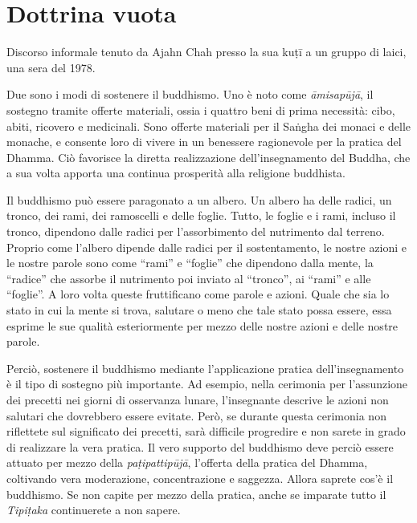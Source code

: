 \chapter{Dottrina vuota}

\begin{openingQuote}
  \centering

  Discorso informale tenuto da Ajahn Chah presso la sua kuṭī a un gruppo
  di laici, una sera del 1978.
\end{openingQuote}

Due sono i modi di sostenere il buddhismo. Uno è noto come
\emph{āmisapūjā}, il sostegno tramite offerte materiali, ossia i quattro
beni di prima necessità: cibo, abiti, ricovero e medicinali. Sono
offerte materiali per il Saṅgha dei monaci e delle monache, e consente
loro di vivere in un benessere ragionevole per la pratica del Dhamma.
Ciò favorisce la diretta realizzazione dell'insegnamento del Buddha, che
a sua volta apporta una continua prosperità alla religione buddhista.

Il buddhismo può essere paragonato a un albero. Un albero ha delle
radici, un tronco, dei rami, dei ramoscelli e delle foglie. Tutto, le
foglie e i rami, incluso il tronco, dipendono dalle radici per
l'assorbimento del nutrimento dal terreno. Proprio come l'albero
dipende dalle radici per il sostentamento, le nostre azioni e le nostre
parole sono come ``rami'' e ``foglie'' che dipendono dalla mente, la
``radice'' che assorbe il nutrimento poi inviato al ``tronco'', ai
``rami'' e alle ``foglie''. A loro volta queste fruttificano come parole
e azioni. Quale che sia lo stato in cui la mente si trova, salutare o
meno che tale stato possa essere, essa esprime le sue qualità
esteriormente per mezzo delle nostre azioni e delle nostre parole.

Perciò, sostenere il buddhismo mediante l'applicazione pratica
dell'insegnamento è il tipo di sostegno più importante. Ad esempio,
nella cerimonia per l'assunzione dei precetti nei giorni di osservanza
lunare, l'insegnante descrive le azioni non salutari che dovrebbero
essere evitate. Però, se durante questa cerimonia non riflettete sul
significato dei precetti, sarà difficile progredire e non sarete in
grado di realizzare la vera pratica. Il vero supporto del buddhismo deve
perciò essere attuato per mezzo della \emph{paṭipattipūjā}, l'offerta
della pratica del Dhamma, coltivando vera moderazione, concentrazione e
saggezza. Allora saprete cos'è il buddhismo. Se non capite per mezzo
della pratica, anche se imparate tutto il \emph{Tipiṭaka} continuerete a
non sapere.

